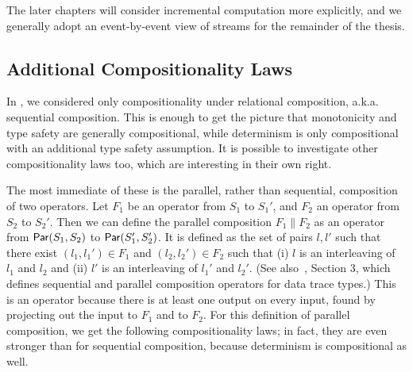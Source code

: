 The later chapters will consider incremental computation more explicitly, and we generally adopt an event-by-event view of streams for the remainder of the thesis.

\subsection{Additional Compositionality Laws}

In , we considered only compositionality under relational composition, a.k.a. sequential composition. This is enough to get the picture that monotonicity and type safety are generally compositional, while determinism is only compositional with an additional type safety assumption.
It is possible to investigate other compositionality laws too, which are interesting in their own right.

The most immediate of these is the parallel, rather than sequential, composition of two operators. Let $F_1$ be an operator from $S_1$ to $S_1'$, and $F_2$ an operator from $S_2$ to $S_2'$.
Then we can define the parallel composition $F_1 \| F_2$ as
an operator from $\mathsf{Par}({S_1}, {S_2})$ to $\mathsf{Par}({S_1'}, {S_2'})$.
It is defined as the set of pairs $l, l'$ such that there exist $(l_1, l_1') \in F_1$ and $(l_2, l_2') \in F_2$ such that (i) $l$ is an interleaving of $l_1$ and $l_2$ and (ii) $l'$ is an interleaving of $l_1'$ and $l_2'$.
(See also~, Section 3, which defines sequential and parallel composition operators for data trace types.)
This is an operator because there is at least one output on every input, found by projecting out the input to $F_1$ and to $F_2$.
For this definition of parallel composition, we get the following compositionality laws; in fact, they are even stronger than for sequential composition,
because determinism is compositional as well.

